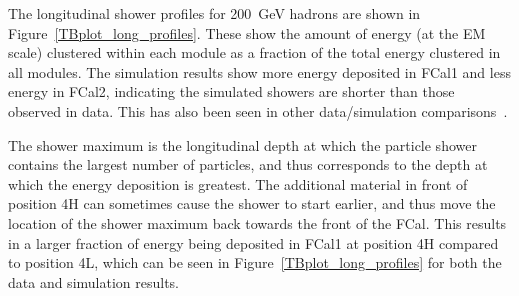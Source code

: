 %

The longitudinal shower profiles for 200~GeV hadrons are shown in Figure~\ref{TBplot_long_profiles}. These show the amount of energy (at the EM scale) clustered within each module as a fraction of the total energy clustered in all modules. The simulation  results show more energy deposited in FCal1 and less energy in FCal2, indicating the simulated showers are shorter than those observed in data. This has also been seen in other \atlas data/simulation comparisons~\cite{TB2004pub,CTB_localHadCal,calpub2010}.

The shower maximum is the longitudinal depth at which the particle shower contains the largest number of particles, and thus corresponds to the depth at which the energy deposition is greatest. The additional material in front of position 4H can sometimes cause the shower to start earlier, and thus move the location of the shower maximum back towards the front of the FCal. This results in a larger fraction of energy being deposited in FCal1 at position 4H compared to position 4L, which can be seen in Figure~\ref{TBplot_long_profiles} for both the data and simulation results.


